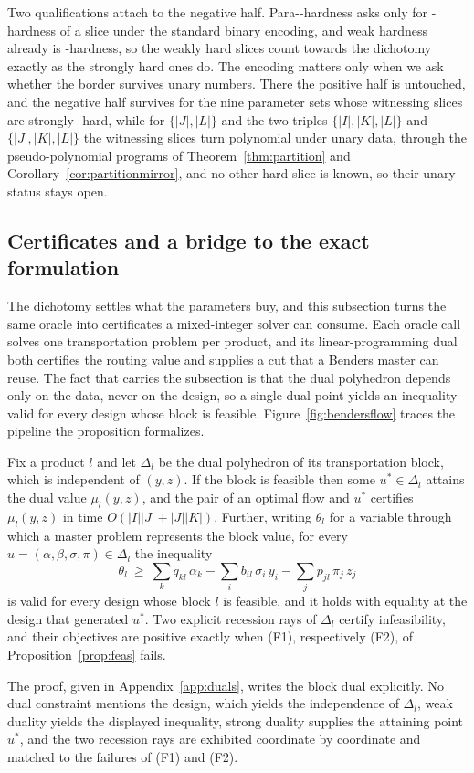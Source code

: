 Two qualifications attach to the negative half. Para-\NP-hardness
asks only for \NP-hardness of a slice under the standard binary encoding,
and weak hardness already is \NP-hardness, so the weakly hard slices count
towards the dichotomy exactly as the strongly hard ones do. The encoding
matters only when we ask whether the border survives unary numbers. There
the positive half is untouched, and the negative half survives for the
nine parameter sets whose witnessing slices are strongly \NP-hard, while
for $\{|J|,|L|\}$ and the two triples $\{|I|,|K|,|L|\}$ and
$\{|J|,|K|,|L|\}$ the witnessing slices turn polynomial under unary data,
through the pseudo-polynomial programs of Theorem~\ref{thm:partition}
and Corollary~\ref{cor:partitionmirror},
and no other hard slice is known, so their unary status stays open.

\subsection{Certificates and a bridge to the exact
formulation}\label{sec:certificates}

The dichotomy settles what the parameters buy, and this subsection
turns the same oracle into certificates a mixed-integer solver can
consume. Each oracle call solves one transportation problem per product, and its
linear-programming dual both certifies the routing value and supplies a
cut that a Benders master can reuse. The fact that carries the
subsection is that the dual polyhedron depends only on the data, never
on the design, so a single dual point
yields an inequality valid for every design whose block is feasible.
Figure~\ref{fig:bendersflow} traces the pipeline the proposition
formalizes.



\begin{proposition}\label{prop:duals}
Fix a product $l$ and let $\Delta_l$ be the dual polyhedron of its
transportation block, which is independent of $(y,z)$. If the block is
feasible then some $u^\ast\in\Delta_l$ attains the dual value
$\mu_l(y,z)$, and the pair of an optimal flow and $u^\ast$ certifies
$\mu_l(y,z)$ in time $O(|I||J|+|J||K|)$. Further, writing $\theta_l$ for
a variable through which a master problem represents the block value, for
every $u=(\alpha,\beta,\sigma,\pi)\in\Delta_l$ the inequality
\[
\theta_l\ \ge\ \sum_k q_{kl}\,\alpha_k
      -\sum_i b_{il}\,\sigma_i\,y_i-\sum_j p_{jl}\,\pi_j\,z_j
\]
is valid for every design whose block $l$ is feasible, and it holds with
equality at the design that generated $u^\ast$. Two explicit recession
rays of $\Delta_l$ certify infeasibility, and their objectives are
positive exactly when (F1), respectively (F2), of
Proposition~\ref{prop:feas} fails.
\end{proposition}
The proof, given in Appendix~\ref{app:duals}, writes the block dual explicitly.
No dual constraint mentions the design, which yields the independence of
$\Delta_l$, weak duality yields the displayed inequality, strong duality
supplies the attaining point $u^\ast$, and the two recession rays are
exhibited coordinate by coordinate and matched to the failures of (F1)
and (F2).

